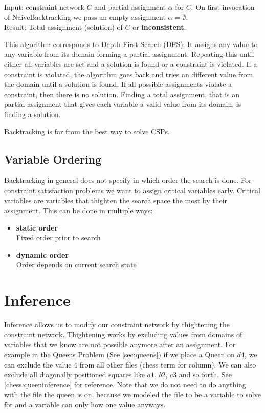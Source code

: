 Input: constraint network $C$ and partial assignment $\alpha$ for $C$. On first invocation of NaiveBacktracking we pass an empty assignment $\alpha = \emptyset$. \\
Result: Total assignment (solution) of $C$ or \textbf{inconsistent}.

This algorithm corresponds to Depth First Search (DFS). It assigns any value to any variable from its domain forming a partial assignment. Repeating this until either all variables are set and a solution is found or a constraint is violated. If a constraint is violated, the algorithm goes back and tries an different value from the domain until a solution is found. If all possible assignments violate a constraint, then there is no solution. Finding a total assignment, that is an partial assignment that gives each variable a valid value from its domain, is finding a solution.

Backtracking is far from the best way to solve CSPs.

\subsection{Variable Ordering}

Backtracking in general does not specify in which order the search is done. For constraint satisfaction problems we want to assign critical variables early. Critical variables are variables that thighten the search space the most by their assignment. This can be done in multiple ways:
\begin{itemize}
	\item \textbf{static order} \\
	      Fixed order prior to search
	\item \textbf{dynamic order} \\
	      Order depends on current search state
\end{itemize}

\section{Inference} \label{inference}

Inference allows us to modify our constraint network by thightening the constraint network. Thightening works by excluding values from domains of variables that we know are not possible anymore after an assignment. For example in the Queens Problem (See \ref{sec:queens}) if we place a Queen on $d4$, we can exclude the value $4$ from all other files (chess term for column). We can also exclude all diagonally positioned squares like $a1$, $b2$, $c3$ and so forth. See \ref{chess:queeninference} for reference. Note that we do not need to do anything with the file the queen is on, because we modeled the file to be a variable to solve for and a variable can only how one value anyways.

